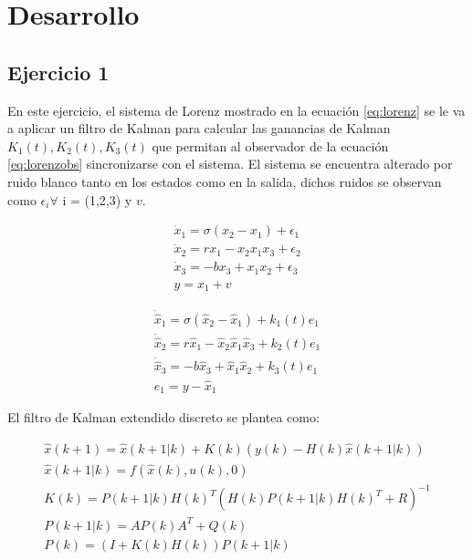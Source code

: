 \section*{Desarrollo}
\subsection*{Ejercicio 1}
En este ejercicio, el sistema de Lorenz mostrado en la ecuación \ref{eq:lorenz} se le va a aplicar un filtro de Kalman para calcular las ganancias de Kalman $K_1(t) , K_2(t) , K_3(t)$ que permitan al observador de la ecuación \ref{eq:lorenzobs} sincronizarse con el sistema. El sistema se encuentra alterado por ruido blanco tanto en los estados como en la salida, dichos ruidos se observan como $\epsilon_i \forall$ i = (1,2,3) y $v$.

\begin{equation}\label{eq:lorenz}
\begin{array}{c}
\dot{x}_1 = \sigma ( x_2 - x_1 ) + \epsilon_1\\
\dot{x}_2 = rx_1 - x_2 x_1x_3 + \epsilon_2\\
\dot{x}_3 = -bx_3 + x_1x_2 + \epsilon_3\\
y = x_1 + v
\end{array}
\end{equation}

\begin{equation}\label{eq:lorenzobs}
\begin{array}{c}
\dot{\hat{x}}_1 = \sigma ( \hat{x}_2 - \hat{x}_1 ) + k_1(t)e_1\\
\dot{\hat{x}}_2 = r\hat{x}_1 - \hat{x}_2 \hat{x}_1\hat{x}_3 + k_2(t)e_1\\
\dot{\hat{x}}_3 = -b\hat{x}_3 + \hat{x}_1\hat{x}_2 + k_3(t)e_1\\
e_1 = y - \hat{x}_1
\end{array}
\end{equation}

El filtro de Kalman extendido discreto se plantea como:

\begin{equation}\label{eq_kalmandisc}
	\begin{array}{l}
		\hat{x}(k+1) = \hat{x}(k+1|k) + K(k)(y(k) - H(k)\hat{x}(k+1|k))\\
		\hat{x}(k+1|k) = f(\hat{x}(k),u(k),0)\\
		K(k) = P(k+1|k)H(k)^T(H(k)P(k+1|k)H(k)^T + R)^{-1}\\
		P(k+1|k) = AP(k)A^T + Q(k)\\
		P(k) = (I + K(k)H(k))P(k+1|k)
	\end{array}
\end{equation}

